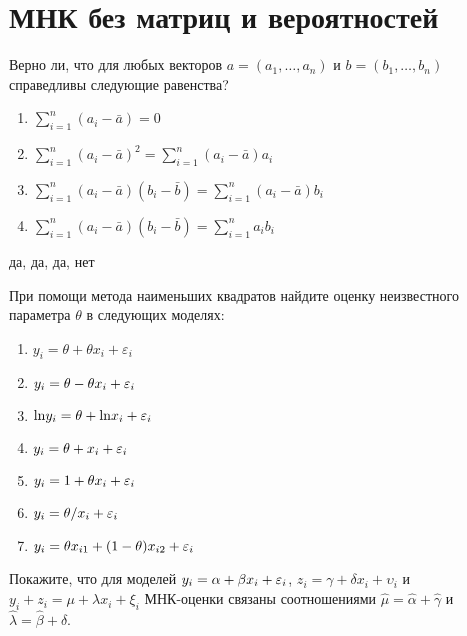 \documentclass[pdftex,11pt,openany]{book}
\begin{document}
\solutiononly




\chapter{МНК без матриц и вероятностей}

\begin{problem}
 Верно ли, что для любых векторов $a = (a_1,\dots,a_n)$ и $b = (b_1,\dots,b_n)$ справедливы следующие равенства?
\begin{enumerate}
\item $\sum_{i=1}^n {(a_i-\bar a)} = 0$
\item $\sum_{i=1}^n {(a_i-\bar a)^2} = \sum_{i=1}^n {(a_i-\bar a)a_i}$
\item $\sum_{i=1}^n {(a_i-\bar a)(b_i-\bar b)} = \sum_{i=1}^n {(a_i-\bar a)b_i}$
\item $\sum_{i=1}^n {(a_i-\bar a)(b_i-\bar b)} = \sum_{i=1}^n {a_i b_i}$
\end{enumerate}
\end{problem}

\begin{solution}
 да, да, да, нет
\end{solution}




\begin{problem}
 При помощи метода наименьших квадратов найдите оценку неизвестного параметра $\theta$ в следующих моделях:

\begin{enumerate}
\item $y_i = \theta + \theta x_i + \varepsilon_i$
\item $y_i = \theta - \theta x_i + \varepsilon_i$
\item $\text{ln} y_i = \theta + \text{ln} x_i + \varepsilon_i$
\item $y_i = \theta + x_i + \varepsilon_i$
\item $y_i = 1 + \theta x_i + \varepsilon_i$
\item $y_i = \theta / x_i + \varepsilon_i$
\item $y_i = \theta x_{i1} + (1-\theta)x_{i2}+\varepsilon_i$
\end{enumerate}
\end{problem}

\begin{solution}
\end{solution}

\begin{problem}
 Покажите, что для моделей $y_i= \alpha + \beta x_i + \varepsilon_i$, $z_i = \gamma + \delta x_i + \upsilon_i$ и $y_i + z_i = \mu + \lambda x_i + \xi_i$ МНК-оценки связаны соотношениями $\hat{\mu}=\hat{\alpha}+\hat{\gamma}$ и $\hat{\lambda}=\hat{\beta} + \hat{\delta}$.
\end{problem}
\end{document}
